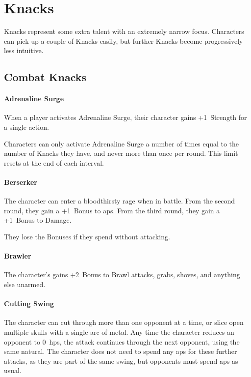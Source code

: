 \chapter[Hall of Knacks]{Knacks}
\label{knacks}

Knacks represent some extra talent with an extremely narrow focus.
Characters can pick up a couple of Knacks easily, but further Knacks become progressively less intuitive.

\section{Combat Knacks}

\begin{multicols}{2}

\subsubsection{Adrenaline Surge}
\label{adrenalinesurge}

When a player activates Adrenaline Surge, their character gains +1~Strength for a single action.

Characters can only activate Adrenaline Surge a number of times equal to the number of Knacks they have, and never more than once per round.
This limit resets at the end of each \gls{interval}.

\subsubsection{Berserker}

The character can enter a bloodthirsty rage when in battle.
From the second \gls{round}, they gain a +1~Bonus to \glspl{ap}.
From the third \gls{round}, they gain a +1~Bonus to Damage.

They lose the Bonuses if they spend  without attacking.

\subsubsection{Brawler}

The character's gains +2~Bonus to Brawl attacks, grabs, shoves, and anything else unarmed.

\subsubsection{Cutting Swing}

The character can cut through more than one opponent at a time, or slice open multiple skulls with a single arc of metal.
Any time the character reduces an opponent to 0~\glspl{hp}, the attack continues through the next opponent, using the same \gls{natural}.
The character does not need to spend any \glspl{ap} for these further attacks, as they are part of the same swing, but opponents must spend \glspl{ap} as usual.


\end{multicols}
